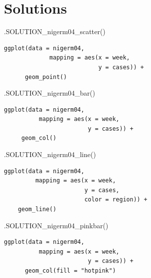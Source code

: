 \documentclass[
  letterpaper,
  DIV=11,
  numbers=noendperiod]{scrreprt}
\newenvironment{Shaded}{\begin{snugshade}}{\end{snugshade}}
\newcommand{\FunctionTok}[1]{\textcolor[rgb]{0.28,0.35,0.67}{#1}}
\newcommand{\NormalTok}[1]{\textcolor[rgb]{0.00,0.23,0.31}{#1}}
\begin{document}
\hypertarget{solutions}{%
\section{Solutions}\label{solutions}}

\begin{Shaded}
\begin{Highlighting}[]
\FunctionTok{.SOLUTION\_nigerm04\_scatter}\NormalTok{()}
\end{Highlighting}
\end{Shaded}

\begin{verbatim}
ggplot(data = nigerm04,
             mapping = aes(x = week, 
                           y = cases)) +
      geom_point()
\end{verbatim}

\begin{Shaded}
\begin{Highlighting}[]
\FunctionTok{.SOLUTION\_nigerm04\_bar}\NormalTok{()}
\end{Highlighting}
\end{Shaded}

\begin{verbatim}
ggplot(data = nigerm04, 
          mapping = aes(x = week, 
                        y = cases)) + 
     geom_col()
\end{verbatim}

\begin{Shaded}
\begin{Highlighting}[]
\FunctionTok{.SOLUTION\_nigerm04\_line}\NormalTok{()}
\end{Highlighting}
\end{Shaded}

\begin{verbatim}
ggplot(data = nigerm04,
         mapping = aes(x = week,
                       y = cases,
                       color = region)) + 
    geom_line()
\end{verbatim}

\begin{Shaded}
\begin{Highlighting}[]
\FunctionTok{.SOLUTION\_nigerm04\_pinkbar}\NormalTok{()}
\end{Highlighting}
\end{Shaded}

\begin{verbatim}
ggplot(data = nigerm04, 
          mapping = aes(x = week, 
                        y = cases)) +
      geom_col(fill = "hotpink")
\end{verbatim}
\end{document}
